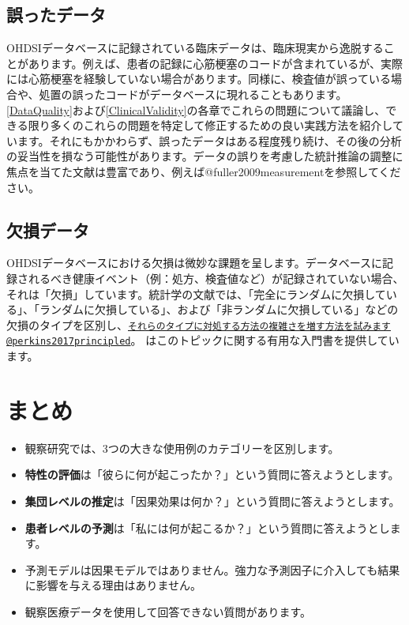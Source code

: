 \documentclass[
  11pt]{book}
\makeatletter
\newenvironment{kframe}{%
\medskip{}
\setlength{\fboxsep}{.8em}
 \def\at@end@of@kframe{}%
 \ifinner\ifhmode%
  \def\at@end@of@kframe{\end{minipage}}%
  \begin{minipage}{\columnwidth}%
 \fi\fi%
 \def\FrameCommand##1{\hskip\@totalleftmargin \hskip-\fboxsep
 \colorbox{myShadeColor}{##1}\hskip-\fboxsep
     \hskip-\linewidth \hskip-\@totalleftmargin \hskip\columnwidth}%
 \MakeFramed {\advance\hsize-\width
   \@totalleftmargin\z@ \linewidth\hsize
   \@setminipage}}%
 {\par\unskip\endMakeFramed%
 \at@end@of@kframe}
\newenvironment{rmdblock}[1]
  {
  \begin{itemize}
  \renewcommand{\labelitemi}{
    \raisebox{-.7\height}[0pt][0pt]{
      {\setkeys{Gin}{width=3em,keepaspectratio}\texttt{[image: images/\#1]}}
    }
  }
  \setlength{\fboxsep}{1em}
  \begin{kframe}
  \item
  }
  {
  \end{kframe}
  \end{itemize}
  }
\newenvironment{rmdsummary}
  {\begin{rmdblock}{summary}}
  {\end{rmdblock}}
\theoremstyle{definition}
\theoremstyle{definition}
\theoremstyle{definition}
\theoremstyle{definition}
\theoremstyle{remark}
\makeatother
\begin{document}
\subsection{誤ったデータ}\label{ux8aa4ux3063ux305fux30c7ux30fcux30bf}

OHDSIデータベースに記録されている臨床データは、臨床現実から逸脱することがあります。例えば、患者の記録に心筋梗塞のコードが含まれているが、実際には心筋梗塞を経験していない場合があります。同様に、検査値が誤っている場合や、処置の誤ったコードがデータベースに現れることもあります。\ref{DataQuality}および\ref{ClinicalValidity}の各章でこれらの問題について議論し、できる限り多くのこれらの問題を特定して修正するための良い実践方法を紹介しています。それにもかかわらず、誤ったデータはある程度残り続け、その後の分析の妥当性を損なう可能性があります。データの誤りを考慮した統計推論の調整に焦点を当てた文献は豊富であり、例えば@fuller2009measurementを参照してください。

\subsection{欠損データ}\label{ux6b20ux640dux30c7ux30fcux30bf}


OHDSIデータベースにおける欠損は微妙な課題を呈します。データベースに記録されるべき健康イベント（例：処方、検査値など）が記録されていない場合、それは「欠損」しています。統計学の文献では、「完全にランダムに欠損している」、「ランダムに欠損している」、および「非ランダムに欠損している」などの欠損のタイプを区別し、\href{mailto:それらのタイプに対処する方法の複雑さを増す方法を試みます@perkins2017principled}{\nolinkurl{それらのタイプに対処する方法の複雑さを増す方法を試みます@perkins2017principled}}。 はこのトピックに関する有用な入門書を提供しています。

\section{まとめ}\label{ux307eux3068ux3081-5}

\begin{rmdsummary}
\begin{itemize}
\item
  観察研究では、3つの大きな使用例のカテゴリーを区別します。
\item
  \textbf{特性の評価}は「彼らに何が起こったか？」という質問に答えようとします。
\item
  \textbf{集団レベルの推定}は「因果効果は何か？」という質問に答えようとします。
\item
  \textbf{患者レベルの予測}は「私には何が起こるか？」という質問に答えようとします。
\item
  予測モデルは因果モデルではありません。強力な予測因子に介入しても結果に影響を与える理由はありません。
\item
  観察医療データを使用して回答できない質問があります。
\end{itemize}
\end{rmdsummary}
\end{document}
